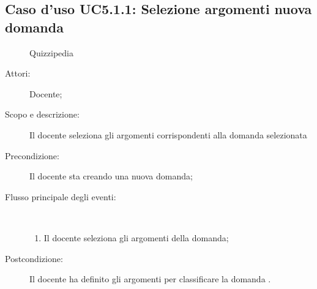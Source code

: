 \subsection{Caso d'uso UC5.1.1: Selezione argomenti nuova domanda}
	\begin{figure}[H]
		\centering
		\begin{resizedtikzpicture}{\textwidth}
		\begin{umlsystem}[x=0, fill=lightgray!20]{Quizzipedia}
		\end{umlsystem}
		\end{resizedtikzpicture}
		\caption{}
	\end{figure}
\begin{description}
\item[Attori:] Docente;
\item[Scopo e descrizione:] Il docente seleziona gli argomenti corrispondenti alla domanda selezionata
      \item[Precondizione:] Il docente sta creando una nuova domanda;

        \item[Flusso principale degli eventi:] \ 
 \begin{enumerate}
          \item Il docente seleziona gli argomenti della domanda;

      \end{enumerate}
    \item[Postcondizione:] Il docente ha definito gli argomenti per classificare la domanda
.
  \end{description}
\hypertarget{UC5.1.2}{}

